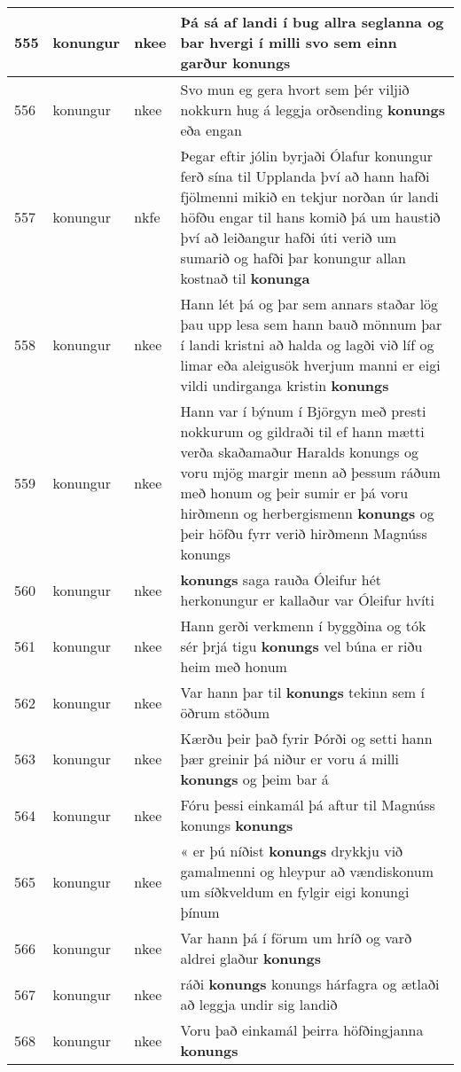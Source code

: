 \documentclass{article}
\begin{document}
\begin{longtable}{p{1cm}|p{1cm}|p{1cm}|p{13cm}}
\hline
555&konungur&nkee&Þá sá af landi í bug allra seglanna og bar hvergi í milli svo sem einn garður \textbf{konungs} \\
\hline
556&konungur&nkee&Svo mun eg gera hvort sem þér viljið nokkurn hug á leggja orðsending \textbf{konungs} eða engan\\
\hline
557&konungur&nkfe&Þegar eftir jólin byrjaði Ólafur konungur ferð sína til Upplanda því að hann hafði fjölmenni mikið en tekjur norðan úr landi höfðu engar til hans komið þá um haustið því að leiðangur hafði úti verið um sumarið og hafði þar konungur allan kostnað til \textbf{konunga} \\
\hline
558&konungur&nkee&Hann lét þá og þar sem annars staðar lög þau upp lesa sem hann bauð mönnum þar í landi kristni að halda og lagði við líf og limar eða aleigusök hverjum manni er eigi vildi undirganga kristin \textbf{konungs} \\
\hline
559&konungur&nkee&Hann var í býnum í Björgyn með presti nokkurum og gildraði til ef hann mætti verða skaðamaður Haralds konungs og voru mjög margir menn að þessum ráðum með honum og þeir sumir er þá voru hirðmenn og herbergismenn \textbf{konungs} og þeir höfðu fyrr verið hirðmenn Magnúss konungs\\
\hline
560&konungur&nkee& \textbf{konungs} saga rauða Óleifur hét herkonungur er kallaður var Óleifur hvíti\\
\hline
561&konungur&nkee&Hann gerði verkmenn í byggðina og tók sér þrjá tigu \textbf{konungs} vel búna er riðu heim með honum\\
\hline
562&konungur&nkee&Var hann þar til \textbf{konungs} tekinn sem í öðrum stöðum\\
\hline
563&konungur&nkee&Kærðu þeir það fyrir Þórði og setti hann þær greinir þá niður er voru á milli \textbf{konungs} og þeim bar á\\
\hline
564&konungur&nkee&Fóru þessi einkamál þá aftur til Magnúss konungs \textbf{konungs} \\
\hline
565&konungur&nkee&« er þú níðist \textbf{konungs} drykkju við gamalmenni og hleypur að vændiskonum um síðkveldum en fylgir eigi konungi þínum\\
\hline
566&konungur&nkee&Var hann þá í förum um hríð og varð aldrei glaður \textbf{konungs} \\
\hline
567&konungur&nkee&ráði \textbf{konungs} konungs hárfagra og ætlaði að leggja undir sig landið\\
\hline
568&konungur&nkee&Voru það einkamál þeirra höfðingjanna \textbf{konungs} \\

\end{longtable}
\end{document}
